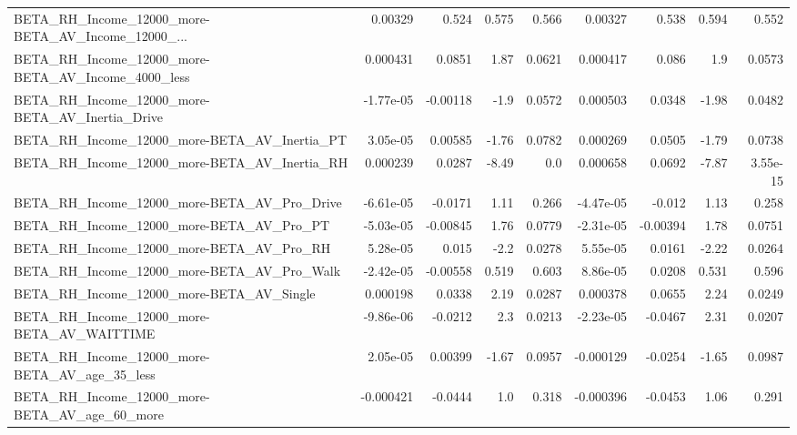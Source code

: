 \begin{tabular}{lrrrrrrrr}
BETA\_RH\_Income\_12000\_more-BETA\_AV\_Income\_12000\_... &     0.00329 &        0.524 &    0.575 &    0.566 &    0.00327 &       0.538 &        0.594 &         0.552 \\
BETA\_RH\_Income\_12000\_more-BETA\_AV\_Income\_4000\_less &    0.000431 &       0.0851 &     1.87 &   0.0621 &   0.000417 &       0.086 &          1.9 &        0.0573 \\
BETA\_RH\_Income\_12000\_more-BETA\_AV\_Inertia\_Drive    &   -1.77e-05 &     -0.00118 &     -1.9 &   0.0572 &   0.000503 &      0.0348 &        -1.98 &        0.0482 \\
BETA\_RH\_Income\_12000\_more-BETA\_AV\_Inertia\_PT       &    3.05e-05 &      0.00585 &    -1.76 &   0.0782 &   0.000269 &      0.0505 &        -1.79 &        0.0738 \\
BETA\_RH\_Income\_12000\_more-BETA\_AV\_Inertia\_RH       &    0.000239 &       0.0287 &    -8.49 &      0.0 &   0.000658 &      0.0692 &        -7.87 &      3.55e-15 \\
BETA\_RH\_Income\_12000\_more-BETA\_AV\_Pro\_Drive        &   -6.61e-05 &      -0.0171 &     1.11 &    0.266 &  -4.47e-05 &      -0.012 &         1.13 &         0.258 \\
BETA\_RH\_Income\_12000\_more-BETA\_AV\_Pro\_PT           &   -5.03e-05 &     -0.00845 &     1.76 &   0.0779 &  -2.31e-05 &    -0.00394 &         1.78 &        0.0751 \\
BETA\_RH\_Income\_12000\_more-BETA\_AV\_Pro\_RH           &    5.28e-05 &        0.015 &     -2.2 &   0.0278 &   5.55e-05 &      0.0161 &        -2.22 &        0.0264 \\
BETA\_RH\_Income\_12000\_more-BETA\_AV\_Pro\_Walk         &   -2.42e-05 &     -0.00558 &    0.519 &    0.603 &   8.86e-05 &      0.0208 &        0.531 &         0.596 \\
BETA\_RH\_Income\_12000\_more-BETA\_AV\_Single           &    0.000198 &       0.0338 &     2.19 &   0.0287 &   0.000378 &      0.0655 &         2.24 &        0.0249 \\
BETA\_RH\_Income\_12000\_more-BETA\_AV\_WAITTIME         &   -9.86e-06 &      -0.0212 &      2.3 &   0.0213 &  -2.23e-05 &     -0.0467 &         2.31 &        0.0207 \\
BETA\_RH\_Income\_12000\_more-BETA\_AV\_age\_35\_less      &    2.05e-05 &      0.00399 &    -1.67 &   0.0957 &  -0.000129 &     -0.0254 &        -1.65 &        0.0987 \\
BETA\_RH\_Income\_12000\_more-BETA\_AV\_age\_60\_more      &   -0.000421 &      -0.0444 &      1.0 &    0.318 &  -0.000396 &     -0.0453 &         1.06 &         0.291 \\

\end{tabular}
